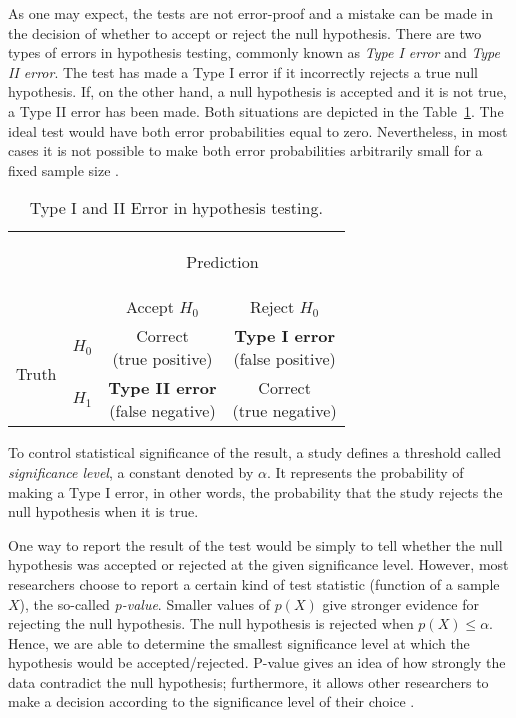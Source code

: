 As one may expect, the tests are not error-proof and a mistake can be made in the decision of whether to accept or reject the null hypothesis. There are two types of errors in hypothesis testing, commonly known as \textit{Type I error} and \textit{Type II error}. The test has made a Type I error if it incorrectly rejects a true null hypothesis. If, on the other hand, a null hypothesis is accepted and it is not true, a Type II error has been made. Both situations are depicted in the Table~\ref{tab:hypothesis_testing_errors}. The ideal test would have both error probabilities equal to zero. Nevertheless, in most cases it is not possible to make both error probabilities arbitrarily small for a fixed sample size \cite{casella}.

\begin{table}[!htbp]
\centering
\renewcommand{\arraystretch}{2.5}
\begin{tabular}{l|l|c|c|}
\multicolumn{2}{c}{}&\multicolumn{2}{c}{\begin{large}Prediction \end{large}}\\
\cline{3-4}
\multicolumn{2}{c|}{}&Accept $H_{0}$&Reject $H_{0}$\\
\cline{2-4}
\multirow{2}{*}{\begin{large}Truth\end{large}}& \textbf{$H_{0}$} & \shortstack{Correct\\(true positive)} & \shortstack{\textbf{Type I error}\\(false positive)}\\
\cline{2-4}
& \textbf{$H_{1}$} & \shortstack{\textbf{Type II error}\\(false negative)} & \shortstack{Correct\\(true negative)} \\
\cline{2-4}
\end{tabular}
\caption{Type I and II Error in hypothesis testing.}\label{tab:hypothesis_testing_errors}
\end{table}

To control statistical significance of the result, a study defines a threshold called \textit{significance level}, a constant denoted by $\alpha$. It represents the probability  of making a Type I error, in other words, the probability that the study rejects the null hypothesis when it is true.

One way to report the result of the test would be simply to tell whether the null hypothesis was accepted or rejected at the given significance level. However, most researchers choose to report a certain kind of test statistic (function of a sample $X$), the so-called \textit{p-value}.
Smaller values of $p(X)$ give stronger evidence for rejecting the null hypothesis. The null hypothesis is rejected when $p(X) \leq \alpha$. Hence, we are able to determine the smallest significance level at which the hypothesis would be accepted/rejected. P-value gives an idea of how strongly the data contradict the null hypothesis; furthermore, it allows other researchers to make a decision according to the significance level of their choice \cite{sham_purcell, casella, lehmann}.

